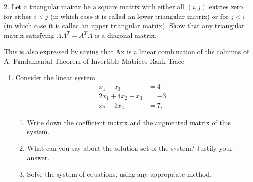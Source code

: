 \documentclass[12pt,a4paper]{article}
\begin{document}
	
	2. Let a triangular matrix be a square matrix with either all $(i,j)$ entries zero for either $i<j$ 
	(in which case it is called an lower triangular matrix) or for $j<i$ (in which case it is called an upper triangular matrix). 
	Show that any triangular matrix satisfying $AA^T = A^TA$ is a diagonal matrix.
	

	
	
	This is also expressed by saying that Ax is a linear combination of the columns of A.
	\newpage
	Fundamental Theorem of Invertible Matrices
	Rank
	Trace
	
	

	
	
	\begin{enumerate}
		\item Consider the linear system
		\begin{align*}
		x_1 + x_3 &= 4\\
		2x_1 + 4x_2 + x_3 &= -3\\
		x_2 + 3x_3 &= 7.
		\end{align*}
		\begin{enumerate}
			\item Write down the coefficient matrix and the augmented matrix of this system. 
			
			\item What can you say about the solution set of the system? Justify your answer. 
			
			\item Solve the system of equations, using any appropriate method. 
		\end{enumerate}
	\end{enumerate}
	
	
\end{document}
